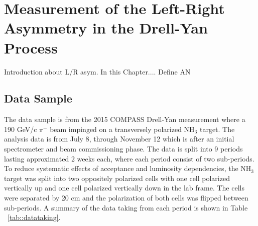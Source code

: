 \chapter{Measurement of the Left-Right Asymmetry in the Drell-Yan Process} 
\label{Chap::leftright}
\ifpdf
\graphicspath{{Chapters/LeftRight/Figs/Raster/}{Chapters/LeftRight/Figs/PDF/}{Chapters/LeftRight/Figs/}}
\else \graphicspath{{Chapters/LeftRight/Figs/Vector/}{Chapters/LeftRight/Figs/}} \fi

Introduction about L/R asym.  In this Chapter....  Define AN


\section{Data Sample}
The data sample is from the 2015 COMPASS Drell-Yan measurement where a 190 GeV/c
$\pi^-$ beam impinged on a transversely polarized NH$_3$ target.  The analysis
data is from July 8, through November 12 which is after an initial spectrometer
and beam commissioning phase.  The data is split into 9 periods lasting
approximated 2 weeks each, where each period consist of two sub-periods.  To
reduce systematic effects of acceptance and luminosity dependencies, the NH$_3$
target was split into two oppositely polarized cells with one cell polarized
vertically up and one cell polarized vertically down in the lab frame.  The
cells were separated by 20 cm and the polarization of both cells was flipped
between sub-periods.  A summary of the data taking from each period is shown in
Table ~\ref{tab::datataking}.

